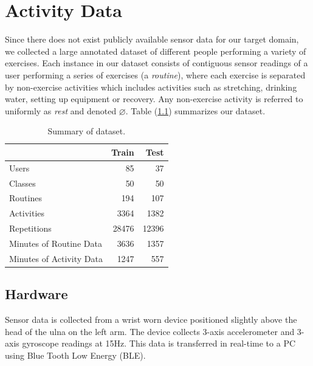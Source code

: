 \documentclass[12pt]{report}
\newcommand{\1}[0]{\mathbbm{1}}
\begin{document}
\chapter{Activity Data}
Since there does not exist publicly available sensor data for our target domain, we collected a large annotated
dataset of different people performing a variety of exercises. Each instance in our dataset consists 
of contiguous sensor readings of a user performing a series of exercises (a \emph{routine}), where each exercise is
separated by non-exercise activities which includes activities such as stretching, drinking water, setting up 
equipment or recovery. Any non-exercise activity is referred to uniformly as \emph{rest} and denoted $\varnothing$. 
Table (\ref{table:dataset}) summarizes our dataset.

\begin{table}[ht]
    \centering
    \begin{tabular}{l r r}\hline
    & \textbf{Train} &\textbf{Test} \\\hline
    Users & 85 & 37\\
    Classes & 50 & 50\\
    Routines & 194 & 107\\
    Activities & 3364 & 1382\\
    Repetitions & 28476 & 12396\\
    Minutes of Routine Data & 3636 & 1357\\
    Minutes of Activity Data & 1247 & 557\\
    \end{tabular}
    \caption{Summary of dataset.}
    \label{table:dataset}
\end{table}

\section{Hardware}
Sensor data is collected from a wrist worn device positioned slightly
above the head of the ulna on the left arm. 
The device collects 3-axis accelerometer and 3-axis gyroscope readings at 15Hz.
This data is transferred in real-time to a PC using Blue Tooth Low Energy (BLE).
\end{document}
